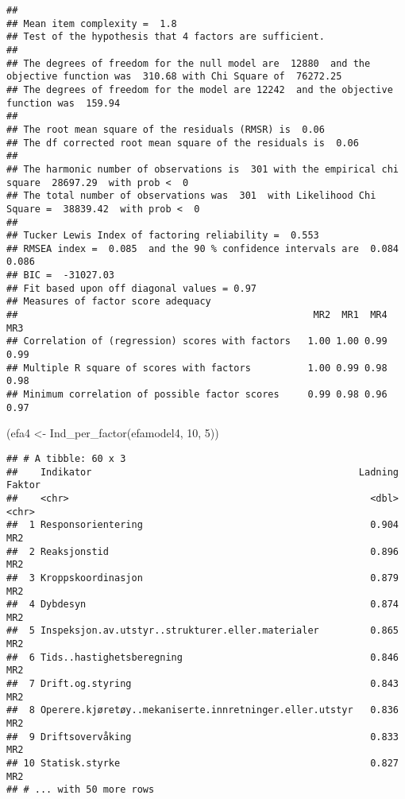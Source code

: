 \documentclass[
]{article}
\newenvironment{Shaded}{\begin{snugshade}}{\end{snugshade}}
\newcommand{\DecValTok}[1]{\textcolor[rgb]{0.00,0.00,0.81}{#1}}
\newcommand{\FunctionTok}[1]{\textcolor[rgb]{0.00,0.00,0.00}{#1}}
\newcommand{\NormalTok}[1]{#1}
\newcommand{\OtherTok}[1]{\textcolor[rgb]{0.56,0.35,0.01}{#1}}
\begin{document}
\begin{verbatim}
## 
## Mean item complexity =  1.8
## Test of the hypothesis that 4 factors are sufficient.
## 
## The degrees of freedom for the null model are  12880  and the objective function was  310.68 with Chi Square of  76272.25
## The degrees of freedom for the model are 12242  and the objective function was  159.94 
## 
## The root mean square of the residuals (RMSR) is  0.06 
## The df corrected root mean square of the residuals is  0.06 
## 
## The harmonic number of observations is  301 with the empirical chi square  28697.29  with prob <  0 
## The total number of observations was  301  with Likelihood Chi Square =  38839.42  with prob <  0 
## 
## Tucker Lewis Index of factoring reliability =  0.553
## RMSEA index =  0.085  and the 90 % confidence intervals are  0.084 0.086
## BIC =  -31027.03
## Fit based upon off diagonal values = 0.97
## Measures of factor score adequacy             
##                                                    MR2  MR1  MR4  MR3
## Correlation of (regression) scores with factors   1.00 1.00 0.99 0.99
## Multiple R square of scores with factors          1.00 0.99 0.98 0.98
## Minimum correlation of possible factor scores     0.99 0.98 0.96 0.97
\end{verbatim}

\begin{Shaded}
\begin{Highlighting}[]
\NormalTok{(efa4 }\OtherTok{\textless{}{-}} \FunctionTok{Ind\_per\_factor}\NormalTok{(efamodel4, }\DecValTok{10}\NormalTok{, }\DecValTok{5}\NormalTok{))}
\end{Highlighting}
\end{Shaded}

\begin{verbatim}
## # A tibble: 60 x 3
##    Indikator                                               Ladning Faktor
##    <chr>                                                     <dbl> <chr> 
##  1 Responsorientering                                        0.904 MR2   
##  2 Reaksjonstid                                              0.896 MR2   
##  3 Kroppskoordinasjon                                        0.879 MR2   
##  4 Dybdesyn                                                  0.874 MR2   
##  5 Inspeksjon.av.utstyr..strukturer.eller.materialer         0.865 MR2   
##  6 Tids..hastighetsberegning                                 0.846 MR2   
##  7 Drift.og.styring                                          0.843 MR2   
##  8 Operere.kjøretøy..mekaniserte.innretninger.eller.utstyr   0.836 MR2   
##  9 Driftsovervåking                                          0.833 MR2   
## 10 Statisk.styrke                                            0.827 MR2   
## # ... with 50 more rows
\end{verbatim}
\end{document}
